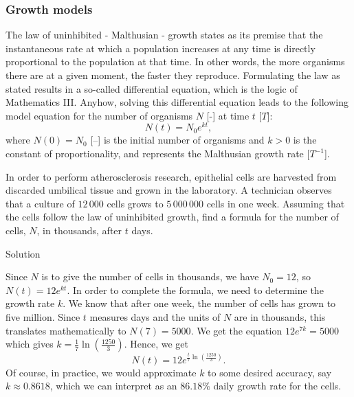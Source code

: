 \subsubsection{Growth models}
The law of uninhibited - Malthusian - growth states as its premise that the instantaneous rate at which a population increases at any time is directly proportional to the population at that time.  In other words, the more organisms there are at a given moment, the faster they reproduce.  Formulating the law as stated results in a so-called differential equation, which is the logic of Mathematics III. Anyhow, solving this differential equation leads to the following model equation for the number of organisms $N$ [-] at time $t$ [$T$]:
\begin{equation}
N(t) = N_{0}e^{kt},
\label{lawofuninhibitedgrowth}
\end{equation}
where $N(0) = N_0$ [--] is the initial number of organisms and $k>0$ is the constant of proportionality, and represents the Malthusian growth rate [$T^{-1}$]. 


\begin{example}
  In order to perform atherosclerosis research, epithelial cells are harvested from discarded umbilical tissue and grown in the laboratory.  A technician observes that a culture of $12\,000$ cells grows to $5\,000\,000$ cells in one week.  Assuming that the cells follow the law of uninhibited growth, find a formula for the number of cells, $N$, in thousands, after $t$ days.


Solution 

   Since $N$ is to give the number of cells in thousands, we have $N_{0} = 12$, so $N(t) = 12e^{kt}$.  In order to complete the formula, we need to determine the growth rate $k$.  We know that after one week, the number of cells has grown to five million.  Since $t$ measures days and the units of $N$ are in thousands, this translates mathematically to $N(7) = 5000$.  We get the equation $12e^{7k} = 5000$ which gives $k = \frac{1}{7} \ln\left(\frac{1250}{3}\right)$.  Hence, we get $$N(t) = 12e^{ \frac{t}{7} \ln\left(\frac{1250}{3}\right)}.$$
  Of course, in practice, we would approximate $k$ to some desired accuracy, say $k \approx 0.8618$, which we can interpret as an $86.18 \%$ daily growth rate for the cells. 

\end{example}

